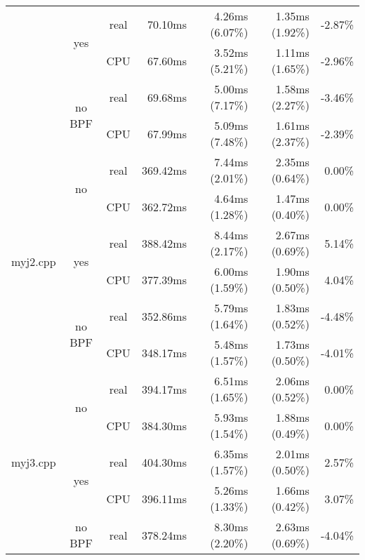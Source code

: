 \documentclass[en]{pracamgr}
\begin{document}
\begin{appendices}
\begin{small}
\begin{longtable}{|l|c|c|r|r|r|r|}
                            & \multirow{2}{*}{yes}    & real & 70.10ms & 4.26ms (6.07\%) & 1.35ms (1.92\%) & -2.87\% \\*
                            &                         & CPU  & 67.60ms & 3.52ms (5.21\%) & 1.11ms (1.65\%) & -2.96\% \\*
                            \cline{2-7}
                            & \multirow{2}{*}{no BPF} & real & 69.68ms & 5.00ms (7.17\%) & 1.58ms (2.27\%) & -3.46\% \\*
                            &                         & CPU  & 67.99ms & 5.09ms (7.48\%) & 1.61ms (2.37\%) & -2.39\% \\
\hline
\multirow{6}{*}{myj2.cpp}   & \multirow{2}{*}{no}     & real & 369.42ms & 7.44ms (2.01\%) & 2.35ms (0.64\%) & 0.00\% \\*
                            &                         & CPU  & 362.72ms & 4.64ms (1.28\%) & 1.47ms (0.40\%) & 0.00\% \\*
                            \cline{2-7}
                            & \multirow{2}{*}{yes}    & real & 388.42ms & 8.44ms (2.17\%) & 2.67ms (0.69\%) & 5.14\% \\*
                            &                         & CPU  & 377.39ms & 6.00ms (1.59\%) & 1.90ms (0.50\%) & 4.04\% \\*
                            \cline{2-7}
                            & \multirow{2}{*}{no BPF} & real & 352.86ms & 5.79ms (1.64\%) & 1.83ms (0.52\%) & -4.48\% \\*
                            &                         & CPU  & 348.17ms & 5.48ms (1.57\%) & 1.73ms (0.50\%) & -4.01\% \\
\hline
\multirow{6}{*}{myj3.cpp}   & \multirow{2}{*}{no}     & real & 394.17ms & 6.51ms (1.65\%) & 2.06ms (0.52\%) & 0.00\% \\*
                            &                         & CPU  & 384.30ms & 5.93ms (1.54\%) & 1.88ms (0.49\%) & 0.00\% \\*
                            \cline{2-7}
                            & \multirow{2}{*}{yes}    & real & 404.30ms & 6.35ms (1.57\%) & 2.01ms (0.50\%) & 2.57\% \\*
                            &                         & CPU  & 396.11ms & 5.26ms (1.33\%) & 1.66ms (0.42\%) & 3.07\% \\*
                            \cline{2-7}
                            & \multirow{2}{*}{no BPF} & real & 378.24ms & 8.30ms (2.20\%) & 2.63ms (0.69\%) & -4.04\% \\*

\end{longtable}
\end{small}
\end{appendices}
\end{document}
